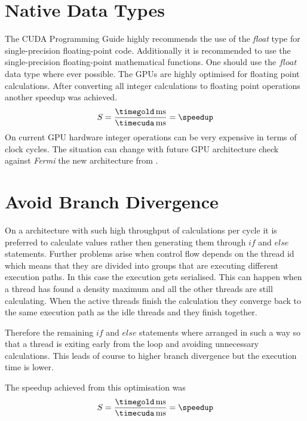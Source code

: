 \section{Native Data Types}
The \gls{CUDA} Programming Guide \citep{citeulike:3325943} highly recommends the
use of the \emph{float} type for single-precision floating-point code.
Additionally it is recommended to use the single-precision floating-point
mathematical functions. One should use the $float$ data type where ever
possible. The \glspl{GPU} are highly optimised for floating point calculations.
After converting all integer calculations to floating point operations another
speedup was achieved.
\fpDiv{\speedup}{\timegold}{\timecuda}
\begin{equation*}\label{eq:speedup5}
	S = \frac{\unit[\timegold]{ms}}{\unit[\timecuda]{ms}} = \speedup
\end{equation*}
On current \gls{GPU} hardware integer operations can be very expensive in terms
of clock cycles. The situation can change with future \gls{GPU} architecture check
against \emph{Fermi} the new architecture from {} 
\citep{citeulike:6640188}.



\section{Avoid Branch Divergence} %
\label{sec:avoid_branch_divergence}
On a architecture with such high throughput of calculations per cycle it is
preferred to calculate values rather then generating them through $if$ and
$else$ statements. Further problems arise when control flow depends on the
thread id which means that they are divided into groups that are executing
different execution paths. In this case the execution gets serialised. This can
happen when a thread has found a density maximum and all the other threads are
still calculating. When the active threads finish the calculation they converge
back to the same execution path as the idle threads and they finish together.

Therefore the remaining $if$ and $else$ statements where arranged in such a way
so that a thread is exiting early from the loop and avoiding unnecessary
calculations. This leads of course to higher branch divergence but the execution
time is lower. 

The speedup achieved from this optimisation was
\fpDiv{\speedup}{\timegold}{\timecuda}
\begin{equation*}\label{eq:speedup6}
	S = \frac{\unit[\timegold]{ms}}{\unit[\timecuda]{ms}} = \speedup
\end{equation*}



